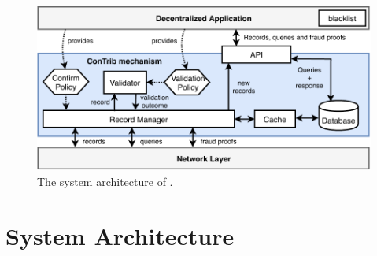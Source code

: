 \begin{figure}[t]
	\centering
	\includegraphics[width=\linewidth]{trustchain/assets/system_architecture}
	\caption{The system architecture of \ModelName{}.}
	\label{fig:system_architecture}
\end{figure}

\section{System Architecture}
\label{sec:system_architecture}


